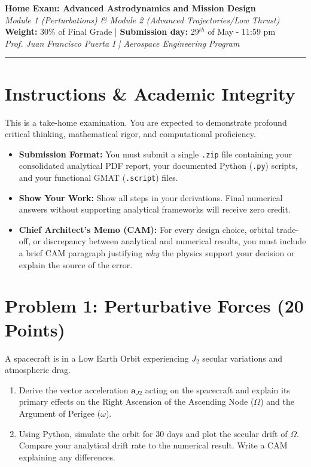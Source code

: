 \documentclass[11pt, letterpaper]{article}
\begin{document}
\begin{center}
    {\Large \textbf{Home Exam: Advanced Astrodynamics and Mission Design}} \\
    \vspace{0.2cm}
    {\large \textit{Module 1 (Perturbations) \& Module 2 (Advanced Trajectories/Low Thrust)}} \\
    \vspace{0.4cm}
    \textbf{Weight:} 30\% of Final Grade | \textbf{Submission day:} 29$^{th}$ of May - 11:59 pm \\
    \textit{Prof. Juan Francisco Puerta I | Aerospace Engineering Program}
\end{center}

\hrule
\vspace{0.5cm}

\section*{Instructions \& Academic Integrity}
This is a take-home examination. You are expected to demonstrate profound critical thinking, mathematical rigor, and computational proficiency. 
\begin{itemize}
    \item \textbf{Submission Format:} You must submit a single \texttt{.zip} file containing your consolidated analytical PDF report, your documented Python (\texttt{.py}) scripts, and your functional GMAT (\texttt{.script}) files.
    \item \textbf{Show Your Work:} Show all steps in your derivations. Final numerical answers without supporting analytical frameworks will receive zero credit.
    \item \textbf{Chief Architect's Memo (CAM):} For every design choice, orbital trade-off, or discrepancy between analytical and numerical results, you must include a brief CAM paragraph justifying \textit{why} the physics support your decision or explain the source of the error.
\end{itemize}

\section*{Problem 1: Perturbative Forces (20 Points)}
A spacecraft is in a Low Earth Orbit experiencing $J_2$ secular variations and atmospheric drag. 
\begin{enumerate}
    \item[(a)] Derive the vector acceleration $\boldsymbol{a}_{J2}$ acting on the spacecraft and explain its primary effects on the Right Ascension of the Ascending Node ($\Omega$) and the Argument of Perigee ($\omega$).
    \item[(b)] Using Python, simulate the orbit for 30 days and plot the secular drift of $\Omega$. Compare your analytical drift rate to the numerical result. Write a CAM explaining any differences.
\end{enumerate}
\end{document}
